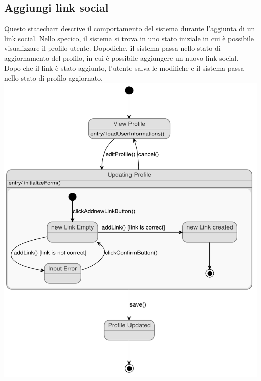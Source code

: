 \subsection{Aggiungi link social}
\begin{center}
Questo statechart descrive il comportamento del sistema durante l'aggiunta di un link social. Nello specico, il sistema si trova in uno stato iniziale in cui è possibile visualizzare il profilo utente. 
Dopodiche, il sistema passa nello stato di aggiornamento del profilo, in cui è possibile aggiungere un nuovo link social.
Dopo che il link è stato aggiunto, l'utente salva le modifiche e il sistema passa nello stato di profilo aggiornato. 
\\ 
\includegraphics[width=.75\textwidth]{assets/state_charts/aggiungi_link_social.pdf}
\end{center}
\newpage

